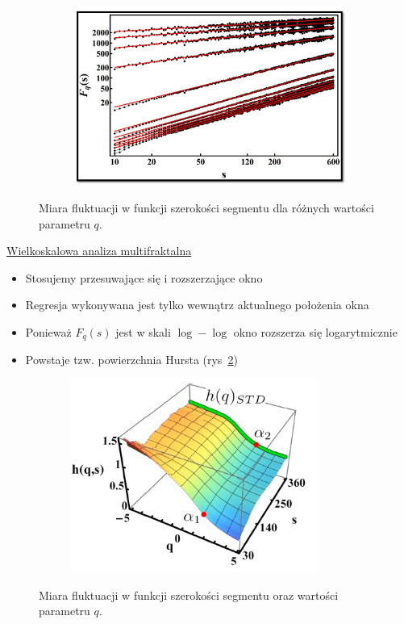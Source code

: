 \begin{figure} [H]
	\centering
	\begin{subfigure}{.8\textwidth}
		\centering
		\includegraphics[width=1.0\linewidth]{EDMIIssues/Figures/dfa.png}
	\end{subfigure}
	\caption{Miara fluktuacji w funkcji szerokości segmentu dla różnych wartości parametru $ q $.}
	\label{dfa}
\end{figure} 

\underline{Wielkoskalowa analiza multifraktalna}

\begin{itemize}
	\item Stosujemy przesuwające się i rozszerzające okno
	\item Regresja wykonywana jest tylko wewnątrz aktualnego położenia okna
	\item Ponieważ $ F_q(s) $ jest w skali $ \log-\log $ okno rozszerza się logarytmicznie
	\item Powstaje tzw. powierzchnia Hursta (rys~\ref{wam})
\end{itemize}

\begin{figure} [H]
	\centering
	\begin{subfigure}{.8\textwidth}
		\centering
		\includegraphics[width=1.0\linewidth]{EDMIIssues/Figures/wam.png}
	\end{subfigure}
	\caption{Miara fluktuacji w funkcji szerokości segmentu oraz wartości parametru $ q $.}
	\label{wam}
\end{figure}